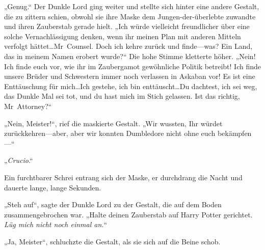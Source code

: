 „Genug.“ Der Dunkle Lord ging weiter und stellte sich hinter eine andere Gestalt, die zu zittern schien, obwohl sie ihre Maske dem Jungen-der-überlebte zuwandte und ihren Zauberstab gerade hielt.
„Ich würde vielleicht freundlicher über eine solche Vernachlässigung denken, wenn ihr meinen Plan mit anderen Mitteln verfolgt hättet…Mr~Counsel. Doch ich kehre zurück und finde—was? Ein Land, das in meinem Namen erobert wurde?“
Die hohe Stimme kletterte höher.
„Nein! Ich finde euch vor, wie ihr im Zaubergamot gewöhnliche Politik betreibt! Ich finde unsere Brüder und Schwestern immer noch verlassen in Askaban vor! Es ist eine Enttäuschung für mich…Ich gestehe, ich bin enttäuscht…Du dachtest, ich sei weg, das Dunkle Mal sei tot, und du hast mich im Stich gelassen. Ist das richtig, Mr~Attorney?“

„Nein, Meister!“, rief die maskierte Gestalt. „Wir wussten, Ihr würdet zurückkehren—aber, aber wir konnten Dumbledore nicht ohne euch bekämpfen—“

„\emph{Crucio}.“

Ein furchtbarer Schrei entrang sich der Maske, er durchdrang die Nacht und dauerte lange, lange Sekunden.

„Steh auf“, sagte der Dunkle Lord zu der Gestalt, die auf dem Boden zusammengebrochen war. „Halte deinen Zauberstab auf Harry Potter gerichtet. \emph{Lüg mich nicht noch einmal an.}“

„Ja, Meister“, schluchzte die Gestalt, als sie sich auf die Beine schob.

